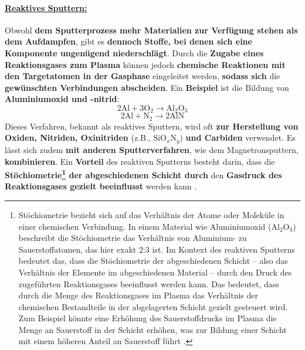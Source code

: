 \documentclass{article} %
\begin{document}
\paragraph{\uline{Reaktives Sputtern:}} Obwohl \textbf{dem Sputterprozess mehr Materialien zur Verfügung stehen als dem Aufdampfen}, gibt es \textbf{dennoch Stoffe, bei denen sich eine Komponente ungenügend niederschlägt}. Durch die \textbf{Zugabe eines Reaktionsgases zum Plasma} können jedoch \textbf{chemische Reaktionen mit den Targetatomen in der Gasphase} eingeleitet werden, \textbf{sodass sich} die \textbf{gewünschten Verbindungen abscheiden}. Ein \textbf{Beispiel} ist die Bildung von \textbf{Aluminiumoxid und -nitrid}:
$$
\mathrm{2Al} + \mathrm{3O}_2 \rightarrow \mathrm{Al}_2\mathrm{O}_3
$$
$$
\mathrm{2Al} + \mathrm{N}_2 \rightarrow \mathrm{2AlN}
$$
Dieses Verfahren, bekannt als reaktives Sputtern, wird oft \textbf{zur Herstellung von Oxiden, Nitriden, Oxinitriden} (z.B., \(\mathrm{SiO}_x\mathrm{N}_y\)) \textbf{und Carbiden} verwendet. Es lässt sich zudem \textbf{mit anderen Sputterverfahren}, wie dem Magnetronsputtern, \textbf{kombinieren}. Ein \textbf{Vorteil} des reaktiven Sputterns besteht darin, dass die \textbf{Stöchiometrie\footnote{Stöchiometrie bezieht sich auf das Verhältnis der Atome oder Moleküle in einer chemischen Verbindung. In einem Material wie Aluminiumoxid (\(\mathrm{Al}_2\mathrm{O}_3\)) beschreibt die Stöchiometrie das Verhältnis von Aluminium- zu Sauerstoffatomen, das hier exakt 2:3 ist. Im Kontext des reaktiven Sputterns bedeutet das, dass die Stöchiometrie der abgeschiedenen Schicht -- also das Verhältnis der Elemente im abgeschiedenen Material -- durch den Druck des zugeführten Reaktionsgases beeinflusst werden kann. Das bedeutet, dass durch die Menge des Reaktionsgases im Plasma das Verhältnis der chemischen Bestandteile in der abgelagerten Schicht gezielt gesteuert wird. Zum Beispiel könnte eine Erhöhung des Sauerstoffdrucks im Plasma die Menge an Sauerstoff in der Schicht erhöhen, was zur Bildung einer Schicht mit einem höheren Anteil an Sauerstoff führt \cite{anders2010reactive, ohring2002, mattox2010handbook, rossnagel2003magnetron}.} der abgeschiedenen Schicht durch} den \textbf{Gasdruck des Reaktionsgases gezielt beeinflusst} werden kann \cite{keplinger2024}.





\vspace{1em}
\end{document}

